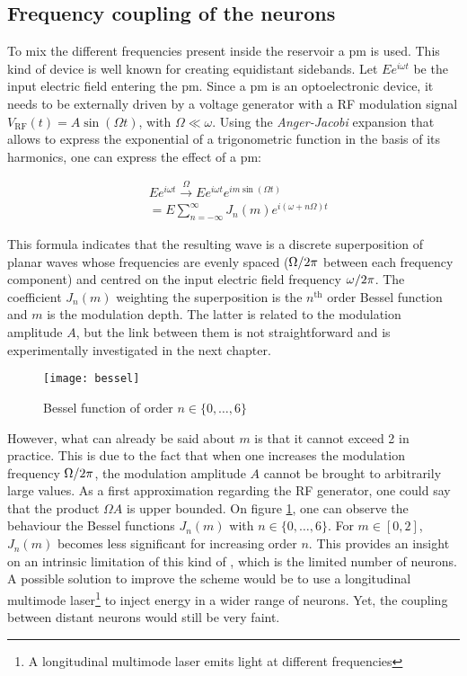 
\subsection{Frequency coupling of the neurons}

\label{subsec-freq-coupling}

To mix the different frequencies present inside the reservoir a \gls{pm} is used. This kind of device is well known for creating equidistant sidebands. Let $Ee^{i\omega t}$ be the input electric field entering the \gls{pm}. Since a \gls{pm} is an optoelectronic device, it needs to be externally driven by a voltage generator with a RF modulation signal $V_{\text{RF}}(t) = A \sin{(\Omega t)}$, with $\Omega \ll \omega$. Using the \textit{Anger-Jacobi} expansion that allows to express the exponential of a trigonometric function in the basis of its harmonics, one can express the effect of a \gls{pm}:

\begin{align}
	&Ee^{i\omega t} \overset{\Omega}{\longrightarrow} Ee^{i\omega t}e^{im\sin{(\Omega t)}} \nonumber \\
	& = E \sum_{n=-\infty}^{\infty} J_n(m) e^{i(\omega+n\Omega)t} \label{tf-pm}
\end{align}

This formula indicates that the resulting wave is a discrete superposition of planar waves whose frequencies are evenly spaced ($\Omega/2\pi$ between each frequency component) and centred on the input electric field frequency $\omega/2\pi$. The coefficient $J_n(m)$ weighting the superposition is the $n^{\text{th}}$ order Bessel function and $m$ is the modulation depth. The latter is related to the modulation amplitude $A$, but the link between them is not straightforward and is experimentally investigated in the next chapter. 

\begin{figure}[h]
	\centering
	\texttt{[image: bessel]}
	\caption{Bessel function of order $n \in \{0,\dots,6\}$}
	\label{bessel}
\end{figure}

However, what can already be said about $m$ is that it cannot exceed 2 in practice. This is due to the fact that when one increases the modulation frequency $\Omega/2\pi$, the modulation amplitude $A$ cannot be brought to arbitrarily large values. As a first approximation regarding the RF generator, one could say that the product $\Omega A$ is upper bounded. On figure \ref{bessel}, one can observe the behaviour the Bessel functions $J_n(m)$ with $n \in \{0,\dots, 6\}$. For $m \in [0,2]$, $J_n(m)$ becomes less significant for increasing order $n$. This provides an insight on an intrinsic limitation of this kind of \rcer, which is the limited number of neurons. A possible solution to improve the scheme would be to use a longitudinal multimode laser\footnote{A longitudinal multimode laser emits light at different frequencies} to inject energy in a wider range of neurons. Yet, the coupling between distant neurons would still be very faint.

